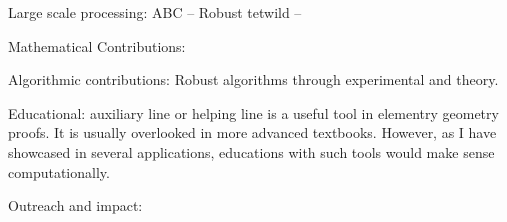 Large scale processing: ABC -- Robust tetwild -- 

Mathematical Contributions:

Algorithmic contributions:
Robust algorithms through experimental and theory.

Educational:
auxiliary line or helping line is a useful tool in elementry geometry proofs. It is usually overlooked in more advanced textbooks. However, as I have showcased in several applications, educations with such tools would make sense computationally.

Outreach and impact:


